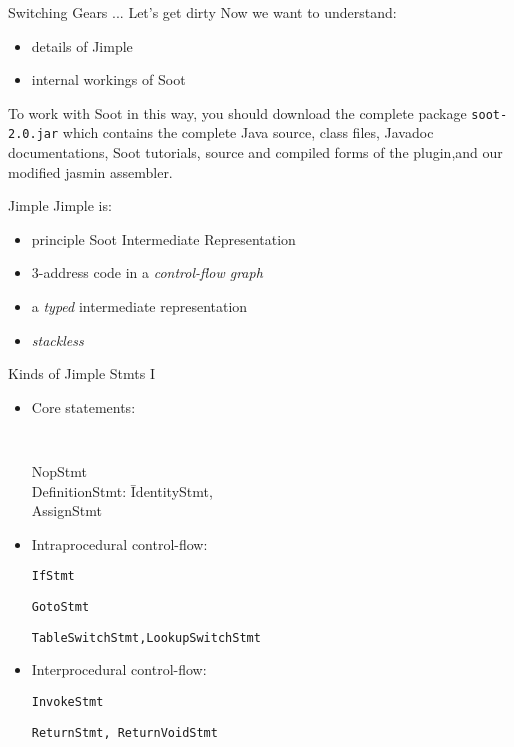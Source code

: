 \begin{slide}{Switching Gears ... Let's get dirty}
Now we want to understand:
\begin{itemize}
\item details of Jimple
\item internal workings of Soot
\end{itemize}

To work with Soot in this way,  you should download the complete package
\texttt{soot-2.0.jar} which contains the complete Java source, class files,
Javadoc documentations, Soot tutorials, source and compiled forms of the plugin,and our modified jasmin assembler. 
\end{slide}

\begin{slide}{Jimple}
Jimple is:
\begin{itemize}
\item principle Soot Intermediate Representation
\item 3-address code in a \emph{control-flow graph}
\item a \emph{typed} intermediate representation
\item \emph{stackless}
\end{itemize}
\end{slide}

\begin{slide}{Kinds of Jimple Stmts I}
\vspace*{-0.1in}
\begin{itemize}
\item Core statements:
\vspace*{-0.1in}
{\tt 
\begin{tabbing}
\quad NopStmt \\
\quad DefinitionStmt: \= IdentityStmt, \\
                \>AssignStmt 
\end{tabbing}}

\vspace*{-0.1in}
\item Intraprocedural control-flow:

{\tt \quad IfStmt}

{\tt \quad GotoStmt}

{\tt \quad TableSwitchStmt,LookupSwitchStmt}

\item Interprocedural control-flow:

{\tt \quad InvokeStmt}

{\tt \quad ReturnStmt, ReturnVoidStmt}

\end{itemize}
\end{slide}

